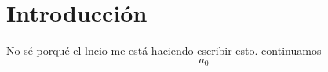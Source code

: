
\chapter{Introducción}
\label{cap:introduccion}


\par No sé porqué el lncio me está haciendo escribir esto. continuamos
\\
\begin{equation}
	a_{0}
	\label{eq:max}
\end{equation}


